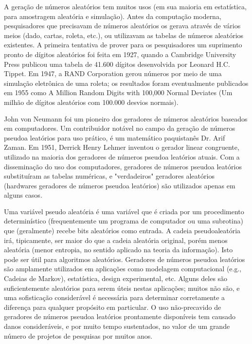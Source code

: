 A geração de números aleatórios tem muitos usos (em sua maioria em estatística, para amostragem aleatória e simulação). Antes da computação moderna, pesquisadores que precisavam de números aleatórios os gerava através de vários meios (dado, cartas, roleta, etc.), ou utilizavam as tabelas de números aleatórios existentes.
A primeira tentativa de prover para os pesquisadores um suprimento pronto de dígitos aleatórios foi feita em 1927, quando a Cambridge University Press publicou uma tabela de 41.600 dígitos desenvolvida por Leonard H.C. Tippet. Em 1947, a RAND Corporation gerou números por meio de uma simulação eletrônica de uma roleta; os resultados foram eventualmente publicados em 1955 como A Million Random Digits with 100,000 Normal Deviates (Um milhão de dígitos aleatórios com 100.000 desvios normais).\cite{Sit}

John von Neumann foi um pioneiro dos geradores de números aleatórios baseados em computadores. Um contribuidor notável no campo da geração de números pseudoa leatórios para uso prático, é um matemático paquistanês Dr. Arif Zaman. Em 1951, Derrick Henry Lehmer inventou o gerador linear congruente, utilizado na maioria dos geradores de números pseudoa leatórios atuais. Com a disseminação do uso dos computadores, geradores de números pseudoa leatórios substituíram as tabelas numéricas, e "verdadeiros" geradores aleatórios (hardwares geradores de números pseudoa leatórios) são utilizados apenas em alguns casos.\cite{Sit}

Uma variável pseudo aleatória é uma variável que é criada por um procedimento determinístico (frequentemente um programa de computador ou uma subrotina) que (geralmente) recebe bits aleatórios como entrada. A cadeia pseudoaleatória irá, tipicamente, ser maior do que a cadeia aleatória original, porém menos aleatória (menor entropia, no sentido aplicado na teoria da informação). Isto pode ser útil para algoritmos aleatórios.
Geradores de números pseudoa leatórios são amplamente utilizados em aplicações como modelagem computacional (e.g., Cadeias de Markov), estatística, design experimental, etc. Alguns deles são suficientemente aleatórios para serem úteis nestas aplicações; muitos não são, e uma sofisticação considerável é necessária para determinar corretamente a diferença para qualquer propósito em particular. O uso não-precavido de geradores de números pseudoa leatórios prontamente disponíveis tem causado danos consideráveis, e por muito tempo sustentados, no valor de um grande número de projetos de pesquisas por muitos anos.\cite{Sit}